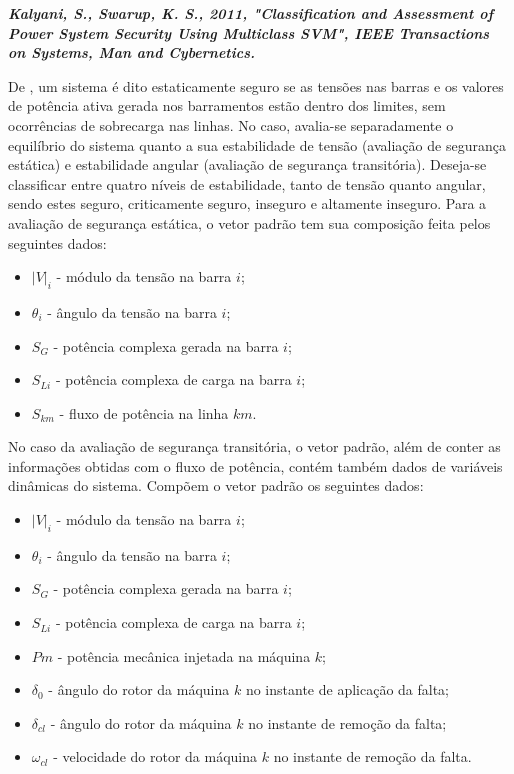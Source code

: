 \documentclass[12pt,oneside,a4paper,chapter=TITLE,section=TITLE,sumario=tradicional,english,brazil]{abntex2}
\begin{document}
	
\textbf{\textit{Kalyani, S., Swarup, K. S., 2011, "Classification and Assessment of Power System Security
Using Multiclass SVM", IEEE Transactions on Systems, Man and Cybernetics.}}\par
	De \textcite{kalyani2011}, um sistema é dito estaticamente seguro se as tensões nas barras e os valores de potência ativa gerada nos barramentos estão dentro dos limites, sem ocorrências de sobrecarga nas linhas. No caso, avalia-se separadamente o equilíbrio do sistema quanto a sua estabilidade de tensão (avaliação de segurança estática) e estabilidade angular (avaliação de segurança transitória). Deseja-se classificar entre quatro níveis de estabilidade, tanto de tensão quanto angular, sendo estes seguro, criticamente seguro, inseguro e altamente inseguro. 
	Para a avaliação de segurança estática, o vetor padrão tem sua composição feita pelos seguintes dados:\par
	\begin{itemize}
\item $|V |_{i}$ - módulo da tensão na barra $i$;
\item $\theta_{i}$ - ângulo da tensão na barra $i$;
\item $S_{G}$ - potência complexa gerada na barra $i$;
\item $S_{Li}$ - potência complexa de carga na barra $i$;
\item $S_{km}$ - fluxo de potência na linha $km$.
	\end{itemize}
	\par
	No caso da avaliação de segurança transitória, o vetor padrão, além de conter as informações obtidas com o fluxo de potência, contém também dados de variáveis dinâmicas do sistema. Compõem o vetor padrão os seguintes dados:\par
	\begin{itemize}
	\item $|V |_{i}$ - módulo da tensão na barra $i$;
	\item $\theta_i$ - ângulo da tensão na barra $i$;
	\item $S_{G}$ - potência complexa gerada na barra $i$;
	\item $S_{Li}$ - potência complexa de carga na barra $i$;
	\item $P{m}$ - potência mecânica injetada na máquina $k$;
	\item $\delta_{0}$ - ângulo do rotor da máquina $k$ no instante de aplicação da falta;
	\item $\delta_{cl}$ - ângulo do rotor da máquina $k$ no instante de remoção da falta;
	\item $\omega_{cl}$ - velocidade do rotor da máquina $k$ no instante de remoção da falta.
	\end{itemize}
\end{document}
